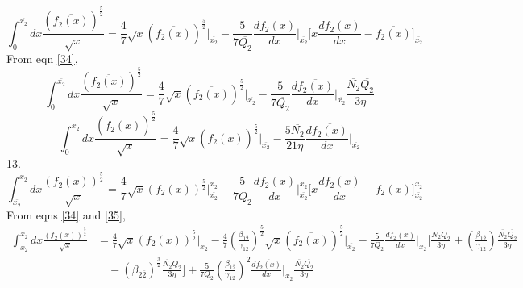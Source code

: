 \documentclass[fleqn, 10pt]{article}
\begin{document}
                      \begin{equation*}
                          \int^{\overline{x_2}}_0 dx \frac{(\overline{f_2(x)})^\frac{5}{2}}{\sqrt{x}} =  \frac{4}{7} \sqrt{x} (\overline{f_2(x)})^\frac{5}{2}\Bigg|_{\overline{x_2}} -  \frac{5}{7\overline{Q_2}}\frac{d\overline{f_2(x)}}{dx} \Bigg|_{\overline{x_2}} \biggl[x\frac{d\overline{f_2(x)}}{dx}-\overline{f_2(x)}\biggr]_{\overline{x_2}}
                      \end{equation*}
                      From eqn \ref{34},
                      \begin{equation*}
                            \int^{\overline{x_2}}_0 dx \frac{(\overline{f_2(x)})^\frac{5}{2}}{\sqrt{x}} =  \frac{4}{7} \sqrt{x} (\overline{f_2(x)})^\frac{5}{2}\Bigg|_{\overline{x_2}} -  \frac{5}{7\overline{Q_2}}\frac{d\overline{f_2(x)}}{dx} \Bigg|_{\overline{x_2}} \frac{\overline{N_2}\overline{Q_2}}{3\eta}
                      \end{equation*}
                      \begin{equation}
                          \int^{\overline{x_2}}_0 dx \frac{(\overline{f_2(x)})^\frac{5}{2}}{\sqrt{x}} =   \frac{4}{7} \sqrt{x} (\overline{f_2(x)})^\frac{5}{2} \Bigg|_{\overline{x_2}} -   \frac{5\overline{N_2}}{21\eta}\frac{d\overline{f_2(x)}}{dx}\Bigg|_{\overline{x_2}}
                          \label{38}
                      \end{equation}
13.
                      \begin{equation*}
                          \int^{x_2}_{\overline{x_2}}dx \frac{(f_2(x))^\frac{5}{2}}{\sqrt{x}}=  \frac{4}{7}\sqrt{x}(f_2(x))^\frac{5}{2}\Bigg|^{x_2}_{\overline{x_2}} -  \frac{5}{7Q_2}\frac{df_2(x)}{dx}\Bigg|^{x_2}_{\overline{x_2}}\biggl[x\frac{df_2(x)}{dx}-f_2(x)\biggr]^{x_2}_{\overline{x_2}}
                      \end{equation*}
                      From eqns \ref{34} and \ref{35},
                      \begin{equation}
                       \begin{split} \int^{x_2}_{\overline{x_2}} dx \frac{(f_2(x))^\frac{5}{2}}{\sqrt{x}} &=   \frac{4}{7} \sqrt{x} (f_2(x))^\frac{5}{2}\Bigg|_{x_2} -   \frac{4}{7} \left(\frac{\beta_{1\overline{2}}}{\gamma_{12}}\right)^\frac{5}{2} \sqrt{x} (\overline{f_2(x)})^\frac{5}{2}\Bigg|_{\overline{x_2}} -  \frac{5}{7Q_2}\frac{df_2(x)}{dx}\Bigg|_{x_2}\biggl[\frac{N_2Q_2}{3\eta} + \left(\frac{\beta_{1\overline{2}}}{\gamma_{12}}\right) \frac{\overline{N_2}\overline{Q_2}}{3\eta} \\ & \quad 
 - (\beta_{2\overline{2}})^\frac{3}{2} \frac{\overline{N_2}Q_2}{3\eta}\biggr]  +   \frac{5}{7Q_2} \left(\frac{\beta_{1\overline{2}}}{\gamma_{12}}\right)^2\frac{d\overline{f_2(x)}}{dx}\Bigg|_{\overline{x_2}}\frac{\overline{N_2}\overline{Q_2}}{3\eta}
                          \label{39}
                          \end{split}
                      \end{equation}
\end{document}
